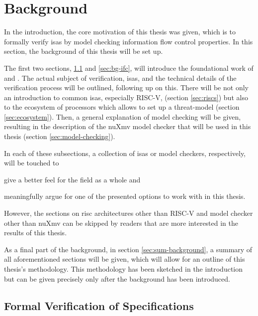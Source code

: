
\chapter{Background}
\label{chp:background}

In the introduction, the core motivation of this thesis was given, which is to formally verify \glspl{isa} by model checking information flow control properties.
In this section, the background of this thesis will be set up.

The first two sections, \ref{sec:verify-spec} and \ref{sec:bg-ifc}, will introduce the foundational work of \citeauthor{Reid17} \cite{Reid17} and \citeauthor{Ferraiuolo17} \cite{Ferraiuolo17}.
The actual subject of verification, \glspl{isa}, and the technical details of the verification process will be outlined, following up on this.
There will be not only an introduction to common \glspl{isa}, especially RISC-V, (section \ref{sec:riscs}) but also to the ecosystem of processors which allows to set up a threat-model (section \ref{sec:ecosystem}).
Then, a general explanation of model checking will be given, resulting in the description of the nuXmv model checker that will be used in this thesis (section \ref{sec:model-checking}).

In each of these subsections, a collection of \glspl{isa} or model checkers, respectively, will be touched to \begin{enumerate*}[label=\alph*)]
    \item give a better feel for the field as a whole and
    \item meaningfully argue for one of the presented options to work with in this thesis.
\end{enumerate*}
However, the sections on \gls{risc} architectures other than RISC-V and model checker other than nuXmv can be skipped by readers that are more interested in the results of this thesis.

As a final part of the background, in section \ref{sec:sum-background}, a summary of all aforementioned sections will be given, which will allow for an outline of this thesis's methodology.
This methodology has been sketched in the introduction but can be given precisely only after the background has been introduced.

\section{Formal Verification of Specifications}
\label{sec:verify-spec}

